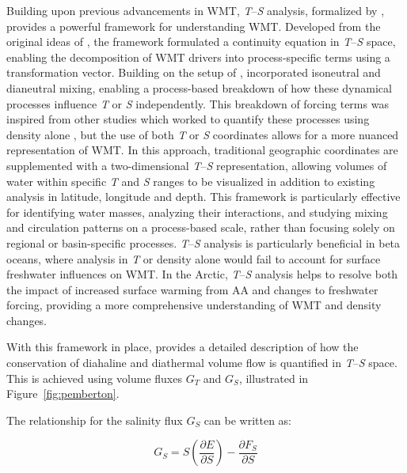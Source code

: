 \documentclass[draft]{agujournal2019}
\begin{document}
Building upon previous advancements in WMT, \emph{T}--\emph{S} analysis, formalized by , provides a powerful framework for understanding WMT. Developed from the original ideas of , the  framework formulated a continuity equation in \emph{T}--\emph{S} space, enabling the decomposition of WMT drivers into process-specific terms using a transformation vector. Building on the setup of ,  incorporated isoneutral and dianeutral mixing, enabling a process-based breakdown of how these dynamical processes influence \emph{T} or \emph{S} independently. This breakdown of forcing terms was inspired from other studies which worked to quantify these processes using density alone \cite{Tziperman1986,Nurser1999,Marshall1999,Iudicone2008}, but the use of both \emph{T} or \emph{S} coordinates allows for a more nuanced representation of WMT. In this approach, traditional geographic coordinates are supplemented with a two-dimensional \emph{T}--\emph{S} representation, allowing volumes of water within specific \emph{T} and \emph{S} ranges to be visualized in addition to existing analysis in latitude, longitude and depth. This framework is particularly effective for identifying water masses, analyzing their interactions, and studying mixing and circulation patterns on a process-based scale, rather than focusing solely on regional or basin-specific processes. \emph{T}--\emph{S} analysis is particularly beneficial in beta oceans, where analysis in \emph{T} or density alone would fail to account for surface freshwater influences on WMT. In the Arctic, \emph{T}--\emph{S} analysis helps to resolve both the impact of increased surface warming from AA and changes to freshwater forcing, providing a more comprehensive understanding of WMT and density changes. 

With this framework in place,  provides a detailed description of how the conservation of diahaline and diathermal volume flow is quantified in \emph{T}--\emph{S} space. This is achieved using volume fluxes $G_T$ and $G_S$, illustrated in Figure~\ref{fig:pemberton}.

The relationship for the salinity flux $G_S$ can be written as:

\begin{equation}
G_S = S \left( \frac{\partial E}{\partial S} \right) - \frac{\partial F_S}{\partial S} \label{eq:g_s}
\end{equation}
\end{document}

